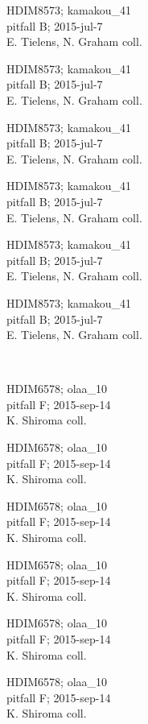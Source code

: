 \documentclass[2pt]{extarticle}
\begin{document}
\noindent
\parbox{0.16\textwidth}{\tiny \raggedright \rule[-0.3\baselineskip]{0pt}{10pt}HDIM8573; kamakou\_41\\ pitfall B; 2015-jul-7\\ E. Tielens, N. Graham coll.}
\parbox{0.16\textwidth}{\tiny \raggedright \rule[-0.3\baselineskip]{0pt}{10pt}HDIM8573; kamakou\_41\\ pitfall B; 2015-jul-7\\ E. Tielens, N. Graham coll.}
\parbox{0.16\textwidth}{\tiny \raggedright \rule[-0.3\baselineskip]{0pt}{10pt}HDIM8573; kamakou\_41\\ pitfall B; 2015-jul-7\\ E. Tielens, N. Graham coll.}
\parbox{0.16\textwidth}{\tiny \raggedright \rule[-0.3\baselineskip]{0pt}{10pt}HDIM8573; kamakou\_41\\ pitfall B; 2015-jul-7\\ E. Tielens, N. Graham coll.}
\parbox{0.16\textwidth}{\tiny \raggedright \rule[-0.3\baselineskip]{0pt}{10pt}HDIM8573; kamakou\_41\\ pitfall B; 2015-jul-7\\ E. Tielens, N. Graham coll.}
\parbox{0.16\textwidth}{\tiny \raggedright \rule[-0.3\baselineskip]{0pt}{10pt}HDIM8573; kamakou\_41\\ pitfall B; 2015-jul-7\\ E. Tielens, N. Graham coll.} \\ 
\vspace{0.001in} 

\noindent
\parbox{0.16\textwidth}{\tiny \raggedright \rule[-0.3\baselineskip]{0pt}{10pt}HDIM6578; olaa\_10\\ pitfall F; 2015-sep-14\\ K. Shiroma coll.}
\parbox{0.16\textwidth}{\tiny \raggedright \rule[-0.3\baselineskip]{0pt}{10pt}HDIM6578; olaa\_10\\ pitfall F; 2015-sep-14\\ K. Shiroma coll.}
\parbox{0.16\textwidth}{\tiny \raggedright \rule[-0.3\baselineskip]{0pt}{10pt}HDIM6578; olaa\_10\\ pitfall F; 2015-sep-14\\ K. Shiroma coll.}
\parbox{0.16\textwidth}{\tiny \raggedright \rule[-0.3\baselineskip]{0pt}{10pt}HDIM6578; olaa\_10\\ pitfall F; 2015-sep-14\\ K. Shiroma coll.}
\parbox{0.16\textwidth}{\tiny \raggedright \rule[-0.3\baselineskip]{0pt}{10pt}HDIM6578; olaa\_10\\ pitfall F; 2015-sep-14\\ K. Shiroma coll.}
\parbox{0.16\textwidth}{\tiny \raggedright \rule[-0.3\baselineskip]{0pt}{10pt}HDIM6578; olaa\_10\\ pitfall F; 2015-sep-14\\ K. Shiroma coll.} \\ 
\vspace{0.001in} 
\end{document}
